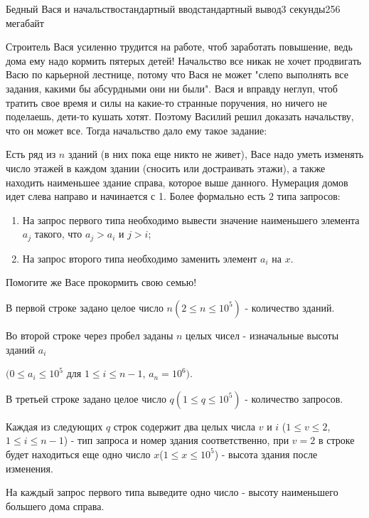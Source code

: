 \begin{problem}{Бедный Вася и начальство}{стандартный ввод}{стандартный вывод}{3 секунды}{256 мегабайт}

Строитель Вася усиленно трудится на работе, чтоб заработать повышение, ведь дома ему надо кормить пятерых детей! Начальство все никак не хочет продвигать Васю по карьерной лестнице, потому что Вася не может "слепо выполнять все задания, какими бы абсурдными они ни были". Вася и вправду неглуп, чтоб тратить свое время и силы на какие-то странные поручения, но ничего не поделаешь, дети-то кушать хотят. Поэтому Василий решил доказать начальству, что он может все. Тогда начальство дало ему такое задание: 

Есть ряд из $n$ зданий (в них пока еще никто не живет), Васе надо уметь изменять число этажей в каждом здании (сносить или достраивать этажи), а также находить наименьшее здание справа, которое выше данного. Нумерация домов идет слева направо и начинается с 1. Более формально есть $2$ типа запросов:
\begin{enumerate}
  \item На запрос первого типа необходимо вывести значение наименьшего элемента $a_j$ такого, что $a_j > a_i$ и $j > i$;
  \item На запрос второго типа необходимо заменить элемент $a_i$ на $x$.
\end{enumerate}
Помогите же Васе прокормить свою семью!

\InputFile
В первой строке задано целое число $n(2 \le n \le 10^5)$ - количество зданий.

Во второй строке через пробел заданы $n$ целых чисел - изначальные высоты зданий $a_i$

$(0 \le a_i \le 10^5$ для $1 \le i \le n - 1$, $a_n = 10^6)$.

В третьей строке задано целое число $q(1 \le q \le 10^5)$ - количество запросов.

Каждая из следующих $q$ строк содержит два целых числа $v$ и $i$ ($1 \le v \le 2$, $1 \le i \le n - 1$) - тип запроса и номер здания соответственно, при $v = 2$ в строке будет находиться еще одно число $x$($1 \le x \le 10^5$) - высота здания после изменения.

\OutputFile
На каждый запрос первого типа выведите одно число - высоту наименьшего большего дома справа.

\Example

\begin{example}
%
\end{example}

\end{problem}

